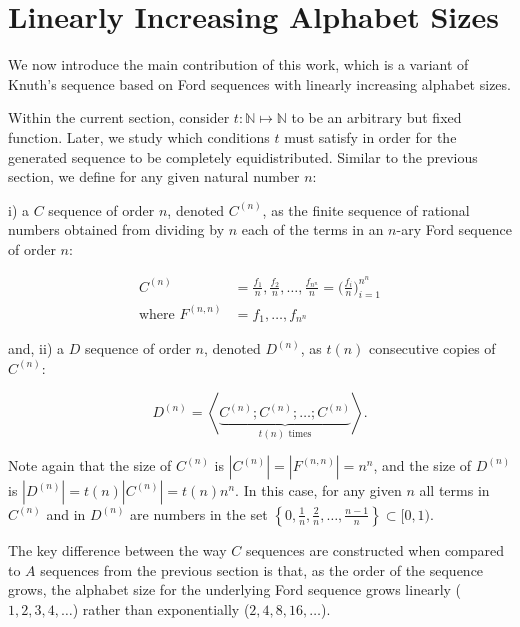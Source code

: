 \documentclass[11pt,a4paper]{tesis}
\theoremstyle{plain}
\theoremstyle{definition}
\begin{document}
\section{Linearly Increasing Alphabet Sizes}\label{section:lias}

We now introduce the main contribution of this work, which is a variant of Knuth's sequence based on Ford sequences with linearly increasing alphabet sizes.

Within the current section, consider $t : \mathbb{N} \mapsto \mathbb{N}$ to be an arbitrary but fixed function. Later, we study which conditions $t$ must satisfy in order for the generated sequence to be completely equidistributed. Similar to the previous section, we define for any given natural number $n$:

i) a $C$ sequence of order $n$, denoted $C^{(n)}$, as the finite sequence of rational numbers obtained from dividing by $n$ each of the terms in an $n$-ary Ford sequence of order $n$:

\begin{equation*}
  \begin{aligned}
    C^{(n)} & = \frac{f_1}{n}, \frac{f_2}{n}, \dots, \frac{f_{n^n}}{n} = \bigg( \frac{f_i}{n} \bigg)_{i = 1}^{n^n} \\
    \text{where } F^{(n, n)} & = f_1, \dots, f_{n^n}
  \end{aligned}
\end{equation*}

and, ii) a $D$ sequence of order $n$, denoted $D^{(n)}$, as $t(n)$ consecutive copies of $C^{(n)}$:

\begin{equation*}
  D^{(n)} = \left< \underbrace{C^{(n)} ; C^{(n)} ; \dots ; C^{(n)}}_{t(n) \text{ times}} \right> \text{.}
\end{equation*}

Note again that the size of $C^{(n)}$ is $|C^{(n)}| = |F^{(n, n)}| = n^n$, and the size of $D^{(n)}$ is $|D^{(n)}| = t(n) |C^{(n)}| = t(n) n^n$. In this case, for any given $n$ all terms in $C^{(n)}$ and in $D^{(n)}$ are numbers in the set $\left \{ 0, \frac{1}{n}, \frac{2}{n}, \dots, \frac{n - 1}{n} \right \} \subset [0, 1)$.

The key difference between the way $C$ sequences are constructed when compared to $A$ sequences from the previous section is that, as the order of the sequence grows, the alphabet size for the underlying Ford sequence grows linearly ($1, 2, 3, 4, \dots$) rather than exponentially ($2, 4, 8, 16, \dots$).
\end{document}
